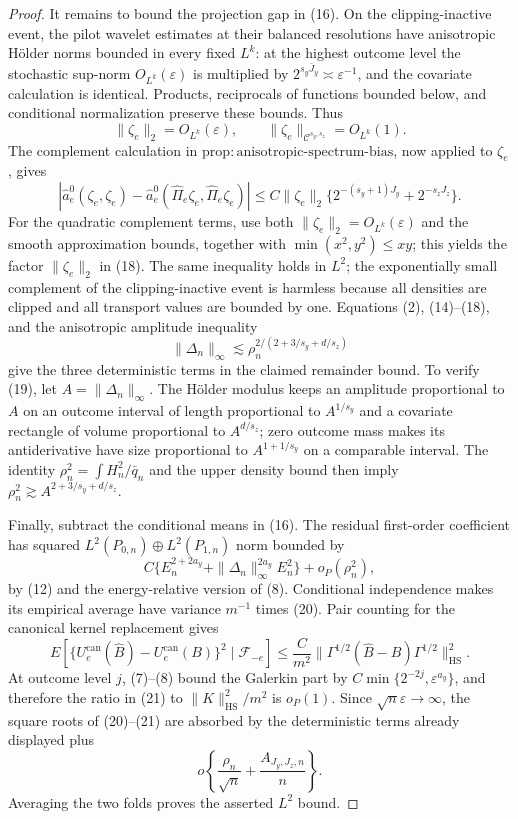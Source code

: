\documentclass{article}
\begin{document}
\begin{proof}
It remains to bound the projection gap in (16). On the clipping-inactive event, the pilot wavelet estimates at their balanced resolutions have anisotropic H\"older norms bounded in every fixed \(L^k\): at the highest outcome level the stochastic sup-norm \(O_{L^k}(\varepsilon)\) is multiplied by \(2^{s_y\bar J_y}\asymp\varepsilon^{-1}\), and the covariate calculation is identical. Products, reciprocals of functions bounded below, and conditional normalization preserve these bounds. Thus
\[
\|\zeta_e\|_2=O_{L^k}(\varepsilon),
\qquad
\|\zeta_e\|_{\mathcal C^{s_y,s_z}}=O_{L^k}(1).                 \tag{17}
\]
The complement calculation in \(\mathrm{prop{:}anisotropic\text{-}spectrum\text{-}bias}\), now applied to \(\zeta_e\), gives
\[
|\widehat a_e^0(\zeta_e,\zeta_e)
-\widehat a_e^0(\widehat\Pi_e\zeta_e,\widehat\Pi_e\zeta_e)|
\le C\|\zeta_e\|_2
\{2^{-(s_y+1)J_y}+2^{-s_zJ_z}\}.                               \tag{18}
\]
For the quadratic complement terms, use both \(\|\zeta_e\|_2=O_{L^k}(\varepsilon)\) and the smooth approximation bounds, together with \(\min(x^2,y^2)\le xy\); this yields the factor \(\|\zeta_e\|_2\) in (18). The same inequality holds in \(L^2\); the exponentially small complement of the clipping-inactive event is harmless because all densities are clipped and all transport values are bounded by one. Equations (2), (14)--(18), and the anisotropic amplitude inequality
\[
\|\Delta_n\|_\infty
\lesssim\rho_n^{2/(2+3/s_y+d/s_z)}                              \tag{19}
\]
give the three deterministic terms in the claimed remainder bound. To verify (19), let \(A=\|\Delta_n\|_\infty\). The H\"older modulus keeps an amplitude proportional to \(A\) on an outcome interval of length proportional to \(A^{1/s_y}\) and a covariate rectangle of volume proportional to \(A^{d/s_z}\); zero outcome mass makes its antiderivative have size proportional to \(A^{1+1/s_y}\) on a comparable interval. The identity \(\rho_n^2=\int H_n^2/\bar q_n\) and the upper density bound then imply \(\rho_n^2\gtrsim A^{2+3/s_y+d/s_z}\).

Finally, subtract the conditional means in (16). The residual first-order coefficient has squared \(L^2(P_{0,n})\oplus L^2(P_{1,n})\) norm bounded by
\[
C\{E_n^{2+2a_y}+\|\Delta_n\|_\infty^{2a_y}E_n^2\}+o_P(\rho_n^2), \tag{20}
\]
by (12) and the energy-relative version of (8). Conditional independence makes its empirical average have variance \(m^{-1}\) times (20). Pair counting for the canonical kernel replacement gives
\[
E[\{U_e^{\mathrm{can}}(\widehat B)-U_e^{\mathrm{can}}(B)\}^2\mid\mathscr F_{-e}]
\le\frac C{m^2}\|\Gamma^{1/2}(\widehat B-B)\Gamma^{1/2}\|_{\mathrm{HS}}^2. \tag{21}
\]
At outcome level \(j\), (7)--(8) bound the Galerkin part by \(C\min\{2^{-2j},\varepsilon^{a_y}\}\), and therefore the ratio in (21) to \(\|K\|_{\mathrm{HS}}^2/m^2\) is \(o_P(1)\). Since \(\sqrt n\varepsilon\to\infty\), the square roots of (20)--(21) are absorbed by the deterministic terms already displayed plus
\[
o\!\left\{\frac{\rho_n}{\sqrt n}+\frac{A_{J_y,J_z,n}}n\right\}. \tag{22}
\]
Averaging the two folds proves the asserted \(L^2\) bound.


\end{proof}
\end{document}

